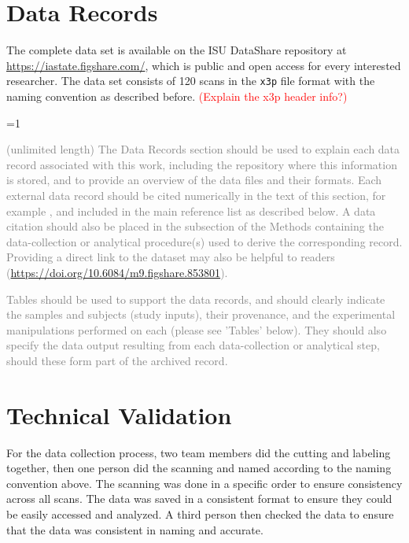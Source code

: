 \documentclass[fleqn,10pt]{wlscirep}
\newcommand{\ifinstruction}{1} %
\begin{document}
\section*{Data Records}

The complete data set is available on the ISU DataShare repository at
\href{https://iastate.figshare.com/}{https://iastate.figshare.com/},
which is public and open access for every interested researcher. The
data set consists of 120 scans in the \texttt{x3p} file format with the
naming convention as described before.
\textcolor{red}{(Explain the x3p header info?)}

\ifnum \ifinstruction=1

\textcolor{gray}{(unlimited length) The Data Records section should be used to explain each data record associated with this work, including the repository where this information is stored, and to provide an overview of the data files and their formats. Each external data record should be cited numerically in the text of this section, for example \cite{Hao:gidmaps:2014}, and included in the main reference list as described below. A data citation should also be placed in the subsection of the Methods containing the data-collection or analytical procedure(s) used to derive the corresponding record. Providing a direct link to the dataset may also be helpful to readers (\hyperlink{https://doi.org/10.6084/m9.figshare.853801}{https://doi.org/10.6084/m9.figshare.853801}).}

\textcolor{gray}{Tables should be used to support the data records, and should clearly indicate the samples and subjects (study inputs), their provenance, and the experimental manipulations performed on each (please see 'Tables' below). They should also specify the data output resulting from each data-collection or analytical step, should these form part of the archived record.}
\fi

\section*{Technical Validation}

For the data collection process, two team members did the cutting and
labeling together, then one person did the scanning and named according
to the naming convention above. The scanning was done in a specific
order to ensure consistency across all scans. The data was saved in a
consistent format to ensure they could be easily accessed and analyzed.
A third person then checked the data to ensure that the data was
consistent in naming and accurate.
\end{document}
